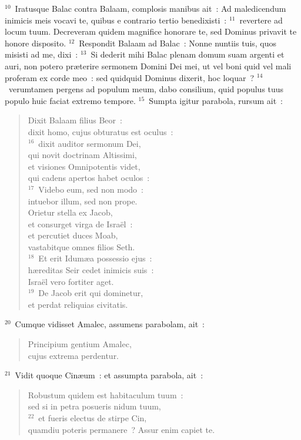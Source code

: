 ${}^{10}$~Iratusque Balac contra Balaam, complosis manibus ait~: Ad maledicendum inimicis meis vocavi te, quibus e contrario tertio benedixisti~:
${}^{11}$~revertere ad locum tuum. Decreveram quidem magnifice honorare te, sed Dominus privavit te honore disposito.
${}^{12}$~Respondit Balaam ad Balac~: Nonne nuntiis tuis, quos misisti ad me, dixi~:
${}^{13}$~Si dederit mihi Balac plenam domum suam argenti et auri, non potero pr\ae terire sermonem Domini Dei mei, ut vel boni quid vel mali proferam ex corde meo~: sed quidquid Dominus dixerit, hoc loquar~?
${}^{14}$~verumtamen pergens ad populum meum, dabo consilium, quid populus tuus populo huic faciat extremo tempore.
${}^{15}$~Sumpta igitur parabola, rursum ait~: \begin{verse}Dixit Balaam filius Beor~:\\ dixit homo, cujus obturatus est oculus~:\\
${}^{16}$~dixit auditor sermonum Dei,\\ qui novit doctrinam Altissimi,\\ et visiones Omnipotentis videt,\\ qui cadens apertos habet oculos~:\\
${}^{17}$~Videbo eum, sed non modo~:\\ intuebor illum, sed non prope.\\ Orietur stella ex Jacob,\\ et consurget virga de Isra\"el~:\\ et percutiet duces Moab,\\ vastabitque omnes filios Seth.\\
${}^{18}$~Et erit Idum\ae a possessio ejus~:\\ h\ae reditas Seir cedet inimicis suis~:\\ Isra\"el vero fortiter aget.\\
${}^{19}$~De Jacob erit qui dominetur,\\ et perdat reliquias civitatis.\\\end{verse}


${}^{20}$~Cumque vidisset Amalec, assumens parabolam, ait~: \begin{verse}Principium gentium Amalec,\\ cujus extrema perdentur.\end{verse}


${}^{21}$~Vidit quoque Cin\ae um~: et assumpta parabola, ait~: \begin{verse}Robustum quidem est habitaculum tuum~:\\ sed si in petra posueris nidum tuum,\\
${}^{22}$~et fueris electus de stirpe Cin,\\ quamdiu poteris permanere~? Assur enim capiet te.\end{verse}


